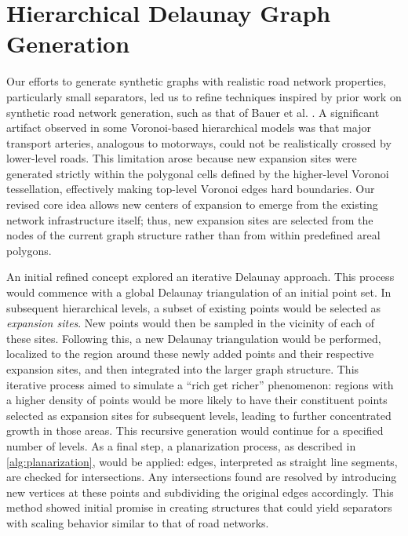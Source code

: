 \section{Hierarchical Delaunay Graph Generation}
\label{sec:hierarchical_delaunay_generation}

Our efforts to generate synthetic graphs with realistic road network properties, particularly small separators, led us to refine techniques inspired by prior work on synthetic road network generation, such as that of Bauer et al. \cite{hutchison_synthetic_2010}.
A significant artifact observed in some Voronoi-based hierarchical models was that major transport arteries, analogous to motorways, could not be realistically crossed by lower-level roads.
This limitation arose because new expansion sites were generated strictly within the polygonal cells defined by the higher-level Voronoi tessellation, effectively making top-level Voronoi edges hard boundaries.
Our revised core idea allows new centers of expansion to emerge from the existing network infrastructure itself; thus, new expansion sites are selected from the nodes of the current graph structure rather than from within predefined areal polygons.

An initial refined concept explored an iterative Delaunay approach.
This process would commence with a global Delaunay triangulation of an initial point set.
In subsequent hierarchical levels, a subset of existing points would be selected as \emph{expansion sites}.
New points would then be sampled in the vicinity of each of these sites.
Following this, a new Delaunay triangulation would be performed, localized to the region around these newly added points and their respective expansion sites, and then integrated into the larger graph structure.
This iterative process aimed to simulate a \enquote{rich get richer} phenomenon: regions with a higher density of points would be more likely to have their constituent points selected as expansion sites for subsequent levels, leading to further concentrated growth in those areas.
This recursive generation would continue for a specified number of levels.
As a final step, a planarization process, as described in \cref{alg:planarization}, would be applied: edges, interpreted as straight line segments, are checked for intersections. Any intersections found are resolved by introducing new vertices at these points and subdividing the original edges accordingly.
This method showed initial promise in creating structures that could yield separators with scaling behavior similar to that of road networks.

